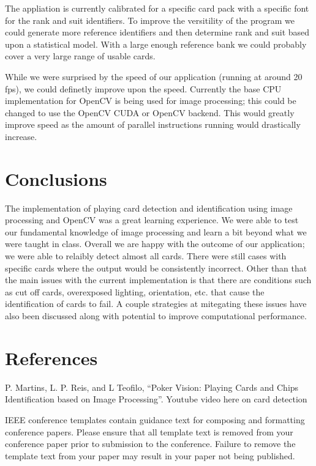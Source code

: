 \documentclass[conference]{IEEEtran}
\begin{document}
The appliation is currently calibrated for a specific card pack with a specific font for the rank
and suit identifiers. To improve the versitility of the program we could generate more reference
identifiers and then determine rank and suit based upon a statistical model. With a large enough
reference bank we could probably cover a very large range of usable cards.

While we were surprised by the speed of our application (running at around 20 fps), we could
definetly improve upon the speed. Currently the base CPU implementation for OpenCV is being used for
image processing; this could be changed to use the OpenCV CUDA or OpenCV backend. This would greatly
improve speed as the amount of parallel instructions running would drastically increase.

\section{Conclusions}
The implementation of playing card detection and identification using image processing and OpenCV
was a great learning experience. We were able to test our fundamental knowledge of image processing
and learn a bit beyond what we were taught in class. Overall we are happy with the outcome of our
application; we were able to relaibly detect almost all cards. There were still cases with specific
cards where the output would be consistently incorrect. Other than that the main issues with the
current implementation is that there are conditions such as cut off cards, overexposed lighting,
orientation, etc. that cause the identification of cards to fail. A couple strategies at mitegating
these issues have also been discussed along with potential to improve computational performance.

\section*{References}
\begin{thebibliography}{00}
 P. Martins, L. P. Reis, and L Teofilo, ``Poker Vision: Playing Cards and
    Chips Identification based on Image Processing''.
 Youtube video here on card detection
\end{thebibliography}
\vspace{12pt}
\color{red}
IEEE conference templates contain guidance text for composing and formatting conference papers. Please ensure that all template text is removed from your conference paper prior to submission to the conference. Failure to remove the template text from your paper may result in your paper not being published.
\end{document}
